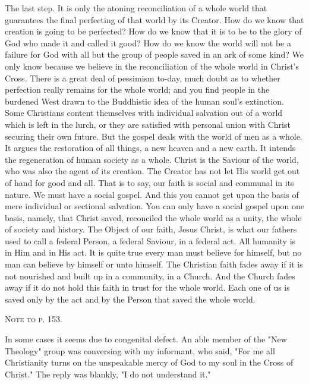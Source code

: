 \documentclass[12pt,letterpaper,oneside]{book}
\begin{document}
The last step. It is only the atoning reconciliation 
of a whole world that guarantees the 
final perfecting of that world by its Creator. 
How do we know that creation is going to 
be perfected? How do we know that it is 
to be to the glory of God who made it and 
called it good? How do we know the world 
will not be a failure for God with all but the 
group of people saved in an ark of some kind? 
We only know because we believe in the 
reconciliation of the whole world in Christ's 
Cross. There is a great deal of pessimism 
to-day, much doubt as to whether perfection 
really remains for the whole world; and you 
find people in the burdened West drawn to 
the Buddhistic idea of the human soul's extinction. 
Some Christians content themselves 
with individual salvation out of a world which 
is left in the lurch, or they are satisfied with 
personal union with Christ securing their 
own future. But the gospel deals with the 
world of men as a whole. It argues the restoration 
of all things, a new heaven and a 
new earth. It intends the regeneration of 
human society as a whole. Christ is the 
Saviour of the world, who was also the agent 
of its creation. The Creator has not let His 
world get out of hand for good and all. That 
is to say, our faith is social and communal in 
its nature. We must have a social gospel. And 
this you cannot get upon the basis of mere 
individual or sectional salvation. You can only 
have a social gospel upon one basis, namely, that 
Christ saved, reconciled the whole world as a 
unity, the whole of society and history. The 
Object of our faith, Jesus Christ, is what our 
fathers used to call a federal Person, a federal 
Saviour, in a federal act. All humanity is in 
Him and in His act. It is quite true every 
man must believe for himself, but no man 
can believe by himself or unto himself. The 
Christian faith fades away if it is not nourished 
and built up in a community, in a Church. 
And the Church fades away if it do not hold 
this faith in trust for the whole world. Each 
one of us is saved only by the act and by the 
Person that saved the whole world. 

\begin{center}
\textsc{Note to p. 153.} 
\end{center}

In some cases it seems due to congenital defect. An 
able member of the "New Theology" group was conversing 
with my informant, who said, "For me all 
Christianity turns on the unspeakable mercy of God to my 
soul in the Cross of Christ." The reply was blankly, "I 
do not understand it." 
\end{document}
